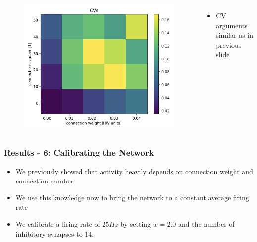 \documentclass{beamer}
\begin{document}
\begin{frame}
\begin{columns}
          \begin{figure}
    				\centering
    				\includegraphics[width=\linewidth]{figures/CV_sweep.png}
 		   \end{figure}
 		   \begin{itemize}
          		\item CV arguments similar as in previous slide
          	\end{itemize}

	\end{columns}

\end{frame}

\begin{frame}
	\frametitle{Results - 6: Calibrating the Network}
	\begin{itemize}
		\item We previously showed that activity heavily depends on connection weight
		and connection number
		\item We use this knowledge now to bring the network to a constant average
		firing rate
		\item We calibrate a firing rate of $25Hz$ by setting $w=2.0$ and the number
		of inhibitory synapses to $14$.
	\end{itemize}
\end{frame}
\end{document}

